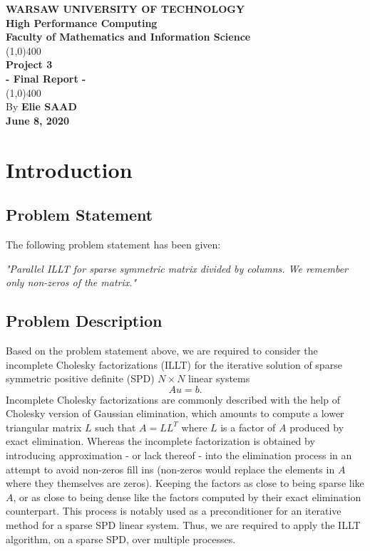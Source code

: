\documentclass[11pt]{article}
\theoremstyle{definition}
\begin{document}
\begin{titlepage}
\begin{center}
\vspace*{1cm}
\Large{\textbf{\MakeUppercase{Warsaw University of Technology}}}\\[3mm]
\huge{\textbf{High Performance Computing}}\\[3mm]
\Large{\textbf{Faculty of Mathematics and Information Science}}\\
\vfill
\line(1,0){400}\\[1mm]
\huge{\textbf{Project 3}}\\[3mm]
\Large{\textbf{- Final Report -}}\\[1mm]
\line(1,0){400}\\
\vfill
By \textbf{Elie SAAD}\\
\Large{\textbf{June 8, 2020}}\\
\end{center}
\end{titlepage}

\tableofcontents
\thispagestyle{empty}
\clearpage

\section{Introduction}

\subsection{Problem Statement}

The following problem statement has been given:
\begin{center}
\textit{"Parallel ILLT for sparse symmetric matrix divided by columns. We remember only non-zeros of the matrix."}
\end{center}

\subsection{Problem Description}

Based on the problem statement above, we are required to consider the incomplete Cholesky factorizations (ILLT) for the iterative solution of sparse symmetric positive definite (SPD) $N\times N$ linear systems
\begin{equation*}
Au=b.
\end{equation*}
Incomplete Cholesky factorizations are commonly described with the help of Cholesky version of Gaussian elimination, which amounts to compute a lower triangular matrix $L$ such that $A=LL^T$ where $L$ is a factor of $A$ produced by exact elimination. Whereas the incomplete factorization is obtained by introducing approximation - or lack thereof - into the elimination process in an attempt to avoid non-zeros fill ins (non-zeros would replace the elements in $A$ where they themselves are zeros). Keeping the factors as close to being sparse like $A$, or as close to being dense like the factors computed by their exact elimination counterpart. This process is notably used as a preconditioner for an iterative method for a sparse SPD linear system. Thus, we are required to apply the ILLT algorithm, on a sparse SPD, over multiple processes.
\end{document}
